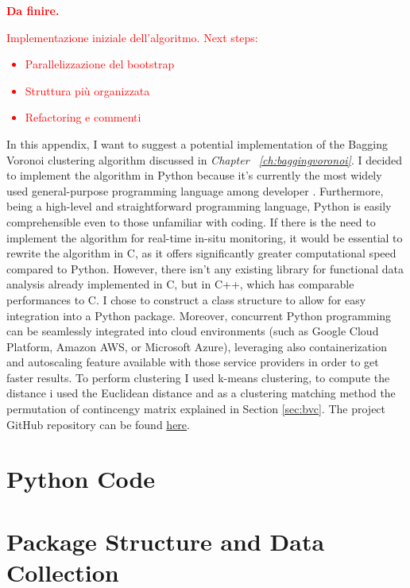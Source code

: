 \textbf{\textcolor{red}{Da finire.}}\\
\textcolor{red}{Implementazione iniziale dell'algoritmo. Next steps:
\begin{itemize}
    \item Parallelizzazione del bootstrap
    \item Struttura più organizzata
    \item Refactoring e commenti
\end{itemize}}
In this appendix, I want to suggest a potential implementation of the Bagging Voronoi clustering algorithm discussed in \emph{Chapter ~\ref{ch:baggingvoronoi}}. I decided to implement the algorithm in Python because it's currently the most widely used general-purpose programming language among developer \cite{lionel_sujay_vailshery_most_2023}. Furthermore, being a high-level and straightforward programming language, Python is easily comprehensible even to those unfamiliar with coding. If there is the need to implement the algorithm for real-time in-situ monitoring, it would be essential to rewrite the algorithm in C, as it offers significantly greater computational speed compared to Python. However, there isn't any existing library for functional data analysis already implemented in C, but in C++, which has comparable performances to C. I chose to construct a class structure to allow for easy integration into a Python package. Moreover, concurrent Python programming can be seamlessly integrated into cloud environments (such as Google Cloud Platform, Amazon AWS, or Microsoft Azure), leveraging also containerization and autoscaling feature available with those service providers in order to get faster results. To perform clustering I used k-means clustering, to compute the distance i used the Euclidean distance and as a clustering matching method the permutation of contincengy matrix explained in Section \ref{sec:bvc}. The project GitHub repository can be found \href{https://github.com/FedericoCantarelli/bvclassificator.git}{here}.
\section{Python Code}
%

\section{Package Structure and Data Collection}


